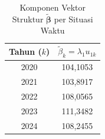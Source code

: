 \begin{table}[H]
\centering
\small
\caption{Komponen Vektor Struktur $\tilde{\boldsymbol{\beta}}$ per Situasi Waktu} \label{tab:app2beta_vec}
\begin{tabular}{|c|c|}
\hline
\textbf{Tahun ($k$)} & \textbf{$\tilde{\beta}_k = \lambda_1 u_{1k}$} \\
\hline
2020 & 104,1053 \\
2021 & 103,8917 \\
2022 & 108,0565 \\
2023 & 111,3482 \\
2024 & 108,2455 \\
\hline
\end{tabular}
\end{table}